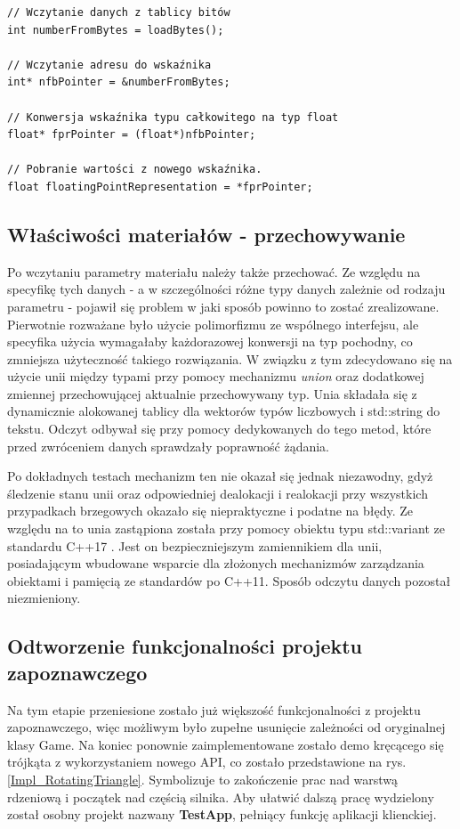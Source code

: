 \begin{lstlisting}[caption={Bitowa konwersja typu całkowitego na float w C++}, label={lst:module:floatingPointHack}]
// Wczytanie danych z tablicy bitów
int numberFromBytes = loadBytes();

// Wczytanie adresu do wskaźnika
int* nfbPointer = &numberFromBytes;

// Konwersja wskaźnika typu całkowitego na typ float
float* fprPointer = (float*)nfbPointer;

// Pobranie wartości z nowego wskaźnika.
float floatingPointRepresentation = *fprPointer;
\end{lstlisting}

\subsection{Właściwości materiałów - przechowywanie}
Po wczytaniu parametry materiału należy także przechować. Ze względu na specyfikę tych danych - a w szczególności różne typy danych zależnie od rodzaju parametru - pojawił się problem w jaki sposób powinno to zostać zrealizowane. Pierwotnie rozważane było użycie polimorfizmu ze wspólnego interfejsu, ale specyfika użycia wymagałaby każdorazowej konwersji na typ pochodny, co zmniejsza użyteczność takiego rozwiązania. W związku z tym zdecydowano się na użycie unii między typami przy pomocy mechanizmu \textit{union} oraz dodatkowej zmiennej przechowującej aktualnie przechowywany typ. Unia składała się z dynamicznie alokowanej tablicy dla wektorów typów liczbowych i std::string do tekstu. Odczyt odbywał się przy pomocy dedykowanych do tego metod, które przed zwróceniem danych sprawdzały poprawność żądania. 

Po dokładnych testach mechanizm ten nie okazał się jednak niezawodny, gdyż śledzenie stanu unii oraz odpowiedniej dealokacji i realokacji przy wszystkich przypadkach brzegowych okazało się niepraktyczne i podatne na błędy. Ze względu na to unia zastąpiona została przy pomocy obiektu typu std::variant ze standardu C++17 \cite{cpp17:variant:2025}. Jest on bezpieczniejszym zamiennikiem dla unii, posiadającym wbudowane wsparcie dla złożonych mechanizmów zarządzania obiektami i pamięcią ze standardów po C++11. Sposób odczytu danych pozostał niezmieniony.

\subsection{Odtworzenie funkcjonalności projektu zapoznawczego}
Na tym etapie przeniesione zostało już większość funkcjonalności z projektu zapoznawczego, więc możliwym było zupełne usunięcie zależności od oryginalnej klasy Game. Na koniec ponownie zaimplementowane zostało demo kręcącego się trójkąta z wykorzystaniem nowego API, co zostało przedstawione na rys. \ref{Impl_RotatingTriangle}. Symbolizuje to zakończenie prac nad warstwą rdzeniową i początek nad częścią silnika. Aby ułatwić dalszą pracę wydzielony został osobny projekt nazwany \textbf{TestApp}, pełniący funkcję aplikacji klienckiej.

